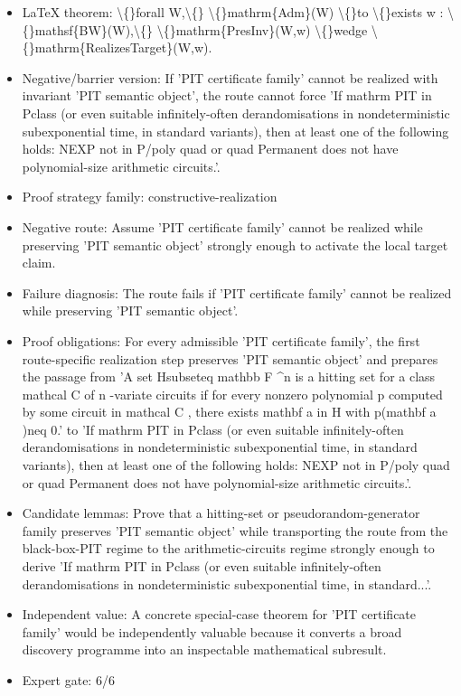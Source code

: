 \documentclass[11pt]{article}
\begin{document}
\begin{itemize}
\item LaTeX theorem: \textbackslash\{\}forall W,\textbackslash\{\} \textbackslash\{\}mathrm\{Adm\}(W) \textbackslash\{\}to \textbackslash\{\}exists w : \textbackslash\{\}mathsf\{BW\}(W),\textbackslash\{\} \textbackslash\{\}mathrm\{PresInv\}(W,w) \textbackslash\{\}wedge \textbackslash\{\}mathrm\{RealizesTarget\}(W,w).
\item Negative/barrier version: If 'PIT certificate family' cannot be realized with invariant 'PIT semantic object', the route cannot force 'If mathrm PIT in Pclass (or even suitable infinitely-often derandomisations in nondeterministic subexponential time, in standard variants), then at least one of the following holds: NEXP not in P/poly quad or quad Permanent does not have polynomial-size arithmetic circuits.'.
\item Proof strategy family: constructive-realization
\item Negative route: Assume 'PIT certificate family' cannot be realized while preserving 'PIT semantic object' strongly enough to activate the local target claim.
\item Failure diagnosis: The route fails if 'PIT certificate family' cannot be realized while preserving 'PIT semantic object'.
\item Proof obligations: For every admissible 'PIT certificate family', the first route-specific realization step preserves 'PIT semantic object' and prepares the passage from 'A set Hsubseteq mathbb F \textasciicircum{}n is a hitting set for a class mathcal C of n -variate circuits if for every nonzero polynomial p computed by some circuit in mathcal C , there exists mathbf a in H with p(mathbf a )neq 0.' to 'If mathrm PIT in Pclass (or even suitable infinitely-often derandomisations in nondeterministic subexponential time, in standard variants), then at least one of the following holds: NEXP not in P/poly quad or quad Permanent does not have polynomial-size arithmetic circuits.'.
\item Candidate lemmas: Prove that a hitting-set or pseudorandom-generator family preserves 'PIT semantic object' while transporting the route from the black-box-PIT regime to the arithmetic-circuits regime strongly enough to derive 'If mathrm PIT in Pclass (or even suitable infinitely-often derandomisations in nondeterministic subexponential time, in standard...'.
\item Independent value: A concrete special-case theorem for 'PIT certificate family' would be independently valuable because it converts a broad discovery programme into an inspectable mathematical subresult.
\item Expert gate: 6/6
\end{itemize}
\end{document}
